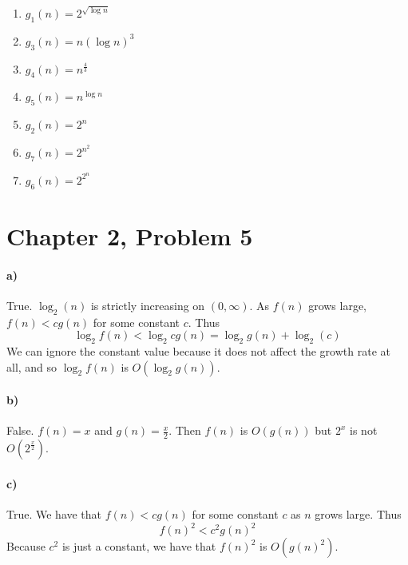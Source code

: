 \documentclass[12pt]{article}
\begin{document}
\begin{enumerate}
        \item \(g_1(n)=2^{\sqrt{\log n}}\)
        \item \(g_3(n)=n(\log n)^3\)
        \item \(g_4(n)=n^\frac{4}{3}\)
        \item \(g_5(n)=n^{\log n}\)
        \item \(g_2(n)=2^n\)
        \item \(g_7(n)=2^{n^2}\)
        \item \(g_6(n)=2^{2^n}\)
\end{enumerate}

\pagebreak

\section*{Chapter 2, Problem 5}

\paragraph{a)}

True. \(\log_2(n)\) is strictly increasing on \((0,\infty)\). As \(f(n)\) grows
large, \(f(n)<cg(n)\) for some constant \(c\). Thus
\[\log_2 f(n)<\log_2 cg(n)=\log_2 g(n) + \log_2(c)\]
We can ignore the constant value because it does not affect the growth rate at
all, and so \(\log_2 f(n)\) is \(O(\log_2 g(n))\).

\paragraph{b)}

False. \(f(n)=x\) and \(g(n)=\frac{x}{2}\). Then \(f(n)\) is \(O(g(n))\) but 
\(2^x\) is not \(O(2^\frac{x}{2})\).

\paragraph{c)}

True. We have that \(f(n)<cg(n)\) for some constant \(c\) as \(n\) grows large. Thus
\[f(n)^2<c^2g(n)^2\]
Because \(c^2\) is just a constant, we have that \(f(n)^2\) is \(O(g(n)^2)\).
\end{document}
